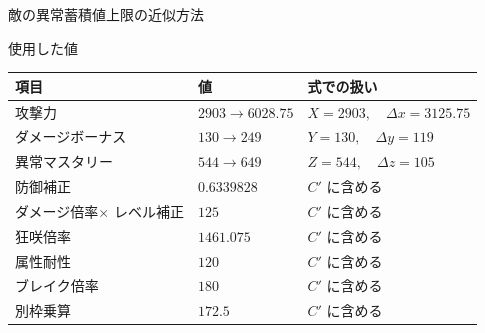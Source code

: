 \documentclass[aspectratio=169]{beamer}
\begin{document}
\begin{frame}{敵の異常蓄積値上限の近似方法}
\begin{block}{使用した値}
\small
\begin{tabularx}{\linewidth}{@{}l l X@{}}
項目 & 値 & 式での扱い \\
\midrule
攻撃力 & $2903 \rightarrow 6028.75$ 
& $X=2903,\quad \Delta x=3125.75$ \\
\midrule
ダメージボーナス & $130 \rightarrow 249$
& $Y=130,\quad \Delta y=119$ \\
\midrule
異常マスタリー & $544 \rightarrow 649$
& $Z=544,\quad \Delta z=105$ \\
\midrule
防御補正 & $0.6339828$
& $C'$ に含める \\
\midrule
ダメージ倍率$\times$ レベル補正 & $125$
& $C'$ に含める \\
\midrule
狂咲倍率 & $1461.075$
& $C'$ に含める \\
\midrule
属性耐性 & $120$
& $C'$ に含める \\
\midrule
ブレイク倍率 & $180$
& $C'$ に含める \\
\midrule
別枠乗算 & $172.5$
& $C'$ に含める \\
\bottomrule
\end{tabularx}
\end{block}
\end{frame}
\end{document}
